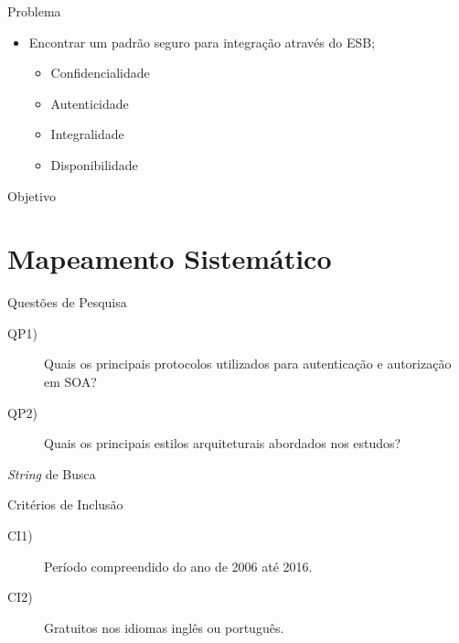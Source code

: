 \documentclass[aspectratio=169, newPxFont]{beamer}
\begin{document}
	\begin{frame}{Problema}
		\begin{itemize}
			\item Encontrar um padrão seguro para integração através do ESB;
			\begin{itemize}
				\item Confidencialidade
				\item Autenticidade
				\item Integralidade
				\item Disponibilidade
			\end{itemize}
		\end{itemize}
	\end{frame}
	
\begin{frame}{Objetivo}
		\fontsize{20}{\baselineskip} \selectfont{
Realizar um mapeamento sistemático para identificar os principais desafios e soluções sobre autenticação e autorização em SOA.}
\end{frame}

\section{Mapeamento Sistemático}

\begin{frame}{Questões de Pesquisa}
	\begin{description}

		\item[QP1)] Quais os principais protocolos utilizados para autenticação e autorização em SOA?
		\item[QP2)] Quais os principais estilos arquiteturais abordados nos estudos?%
	\end{description}
\end{frame}

\begin{frame}{\textit{String} de Busca}
		\fontsize{17}{\baselineskip} 
\end{frame}

\begin{frame}{Critérios de Inclusão}
	\begin{description}
		\item [CI1)]Período compreendido do ano de 2006 até 2016. 
		\item [CI2)] Gratuitos nos idiomas inglês ou português. 
	\end{description}
	
\end{frame}
\end{document}
